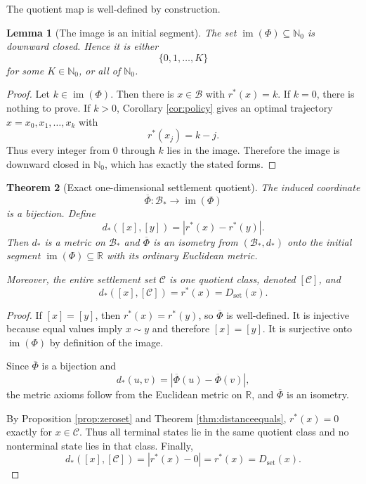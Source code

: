 \documentclass[11pt,letterpaper]{article}
\newtheorem{theorem}{Theorem}[section]
\newtheorem{lemma}[theorem]{Lemma}
\theoremstyle{remark}
\newcommand{\Cset}{\mathcal C}
\newcommand{\Basin}{\mathcal B}
\newcommand{\N}{\mathbb N}
\newcommand{\R}{\mathbb R}
\newcommand{\rstar}{r^{\!*}}
\newcommand{\dset}{D_{\mathrm{set}}}
\newcommand{\im}{\operatorname{im}}
\begin{document}
The quotient map is well-defined by construction.

\begin{lemma}[The image is an initial segment]\label{lem:initialsegment}
The set $\im(\Phi)\subseteq\N_0$ is downward closed. Hence it is either
\[
\{0,1,\ldots,K\}
\]
for some $K\in\N_0$, or all of $\N_0$.
\end{lemma}

\begin{proof}
Let $k\in\im(\Phi)$. Then there is $x\in\Basin$ with $\rstar(x)=k$. If $k=0$, there is nothing to prove. If $k>0$, Corollary \ref{cor:policy} gives an optimal trajectory $x=x_0,x_1,\ldots,x_k$ with
\[
\rstar(x_j)=k-j.
\]
Thus every integer from $0$ through $k$ lies in the image. Therefore the image is downward closed in $\N_0$, which has exactly the stated forms.
\end{proof}

\begin{theorem}[Exact one-dimensional settlement quotient]\label{thm:quotient}
The induced coordinate
\[
\overline\Phi:\Basin_{\!*}\longrightarrow \im(\Phi)
\]
is a bijection. Define
\[
d_{\!*}([x],[y])=|\rstar(x)-\rstar(y)|.
\]
Then $d_{\!*}$ is a metric on $\Basin_{\!*}$ and $\overline\Phi$ is an isometry from $(\Basin_{\!*},d_{\!*})$ onto the initial segment $\im(\Phi)\subseteq\R$ with its ordinary Euclidean metric.

Moreover, the entire settlement set $\Cset$ is one quotient class, denoted $[\Cset]$, and
\[
\boxed{d_{\!*}([x],[\Cset])=\rstar(x)=\dset(x).}
\]
\end{theorem}

\begin{proof}
If $[x]=[y]$, then $\rstar(x)=\rstar(y)$, so $\overline\Phi$ is well-defined. It is injective because equal values imply $x\sim y$ and therefore $[x]=[y]$. It is surjective onto $\im(\Phi)$ by definition of the image.

Since $\overline\Phi$ is a bijection and
\[
d_{\!*}(u,v)=|\overline\Phi(u)-\overline\Phi(v)|,
\]
the metric axioms follow from the Euclidean metric on $\R$, and $\overline\Phi$ is an isometry.

By Proposition \ref{prop:zeroset} and Theorem \ref{thm:distanceequals}, $\rstar(x)=0$ exactly for $x\in\Cset$. Thus all terminal states lie in the same quotient class and no nonterminal state lies in that class. Finally,
\[
d_{\!*}([x],[\Cset])=|\rstar(x)-0|=\rstar(x)=\dset(x).
\]
\end{proof}
\end{document}
